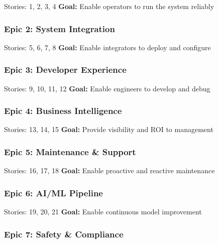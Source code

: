 \documentclass[
]{article}
\begin{document}
Stories: 1, 2, 3, 4 \textbf{Goal:} Enable operators to run the system
reliably

\hypertarget{epic-2-system-integration}{%
\subsubsection{Epic 2: System
Integration}\label{epic-2-system-integration}}

Stories: 5, 6, 7, 8 \textbf{Goal:} Enable integrators to deploy and
configure

\hypertarget{epic-3-developer-experience}{%
\subsubsection{Epic 3: Developer
Experience}\label{epic-3-developer-experience}}

Stories: 9, 10, 11, 12 \textbf{Goal:} Enable engineers to develop and
debug

\hypertarget{epic-4-business-intelligence}{%
\subsubsection{Epic 4: Business
Intelligence}\label{epic-4-business-intelligence}}

Stories: 13, 14, 15 \textbf{Goal:} Provide visibility and ROI to
management

\hypertarget{epic-5-maintenance-support}{%
\subsubsection{Epic 5: Maintenance \&
Support}\label{epic-5-maintenance-support}}

Stories: 16, 17, 18 \textbf{Goal:} Enable proactive and reactive
maintenance

\hypertarget{epic-6-aiml-pipeline}{%
\subsubsection{Epic 6: AI/ML Pipeline}\label{epic-6-aiml-pipeline}}

Stories: 19, 20, 21 \textbf{Goal:} Enable continuous model improvement

\hypertarget{epic-7-safety-compliance}{%
\subsubsection{Epic 7: Safety \&
Compliance}\label{epic-7-safety-compliance}}
\end{document}

